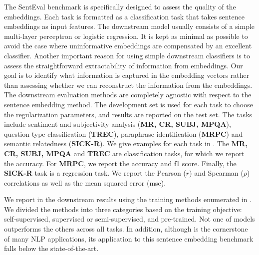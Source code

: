 The SentEval benchmark \parencite{conneau_18} is specifically designed to assess the quality of the embeddings. Each task is formatted as a classification task that takes sentence embeddings as input features. The downstream model usually consists of a simple multi-layer perceptron or logistic regression. It is kept as minimal as possible to avoid the case where uninformative embeddings are compensated by an excellent classifier. Another important reason for using simple downstream classifiers is to assess the straightforward extractability of information from embeddings. Our goal is to identify what information is captured in the embedding vectors rather than assessing whether we can reconstruct the information from the embeddings. The downstream evaluation methods are completely agnostic with respect to the sentence embedding method. The development set is used for each task to choose the regularization parameters, and results are reported on the test set. The tasks include sentiment and subjectivity analysis (\textbf{MR, CR, SUBJ, MPQA}), question type classification (\textbf{TREC}), paraphrase identification (\textbf{MRPC}) and semantic relatedness (\textbf{SICK-R}). We give examples for each task in . The \textbf{MR, CR, SUBJ, MPQA} and \textbf{TREC} are classification tasks, for which we report the accuracy. For \textbf{MRPC}, we report the accuracy and f1 score. Finally, the \textbf{SICK-R} task is a regression task. We report the Pearson ($r$) and Spearman ($\rho$) correlations as well as the mean squared error (mse).

We report in  the downstream results using the training methods enumerated in . We divided the methods into three categories based on the training objective: self-supervised, supervised or semi-supervised, and pre-trained. Not one of models outperforms the others across all tasks. In addition, although \bert is the cornerstone of many NLP applications, its application to this sentence embedding benchmark falls below the state-of-the-art.



